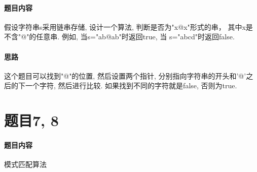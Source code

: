 \documentclass[a4paper]{article}
\begin{document}
\paragraph*{题目内容}
假设字符串s采用链串存储, 设计一个算法, 判断是否为"x@x"形式的串，
其中x是不含"@"的任意串. 例如, 当s="ab@ab"时返回true, 当
s="abcd"时返回false.

\paragraph*{思路}
这个题目可以找到"@"的位置, 然后设置两个指针, 分别指向字符串的开头和'@'之后的下一个字符, 然后进行比较. 如果找到不同的字符就是false, 否则为true.



\section*{题目7, 8}

\paragraph*{题目内容}
模式匹配算法



\end{document}
